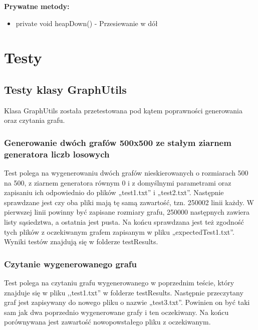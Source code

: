 \documentclass[11pt,a4paper]{report}
\def\console #1{\begingroup\fontfamily{qcr}\selectfont#1\endgroup}
\begin{document}
    \textbf{Prywatne metody:}

    \begin{itemize}
        \item \console{private void heapDown()} - Przesiewanie w dół
    \end{itemize}




    \newpage
    \chapter{Testy}
	
	\newpage
	\section{Testy klasy GraphUtils}
	
	Klasa \console{GraphUtils} została przetestowana pod kątem poprawności generowania oraz czytania grafu.
	
	\vspace{2em}
	
	\subsection{Generowanie dwóch grafów 500x500 ze stałym ziarnem generatora liczb losowych}
	
	Test polega na wygenerowaniu dwóch grafów nieskierowanych o rozmiarach 500 na 500, 
	z ziarnem generatora równym 0 i z domyślnymi parametrami oraz zapisaniu ich odpowiednio do plików „test1.txt” i „test2.txt”. 
	Następnie sprawdzane jest czy oba pliki mają tę samą zawartość, tzn. 250002 linii każdy. 
	W pierwszej linii powinny być zapisane rozmiary grafu, 250000 następnych zawiera listy sąsiedztwa, 
	a ostatnia jest pusta. Na końcu sprawdzana jest też zgodność tych plików z oczekiwanym grafem zapisanym w pliku „expectedTest1.txt”.
	Wyniki testów znajdują się w folderze \console{testResults}.
	
	\vspace{2em}
	
	\subsection{Czytanie wygenerowanego grafu}
	
	Test polega na czytaniu grafu wygenerowanego w poprzednim teście, który znajduje się w pliku ,,test1.txt” w folderze \console{testResults}.
	Następnie przeczytany graf jest zapisywany do nowego pliku o nazwie „test3.txt”. 
	Powinien on być taki sam jak dwa poprzednio wygenerowane grafy i ten oczekiwany. 
	Na końcu porównywana jest zawartość nowopowstałego pliku z oczekiwanym.
	
\end{document}
